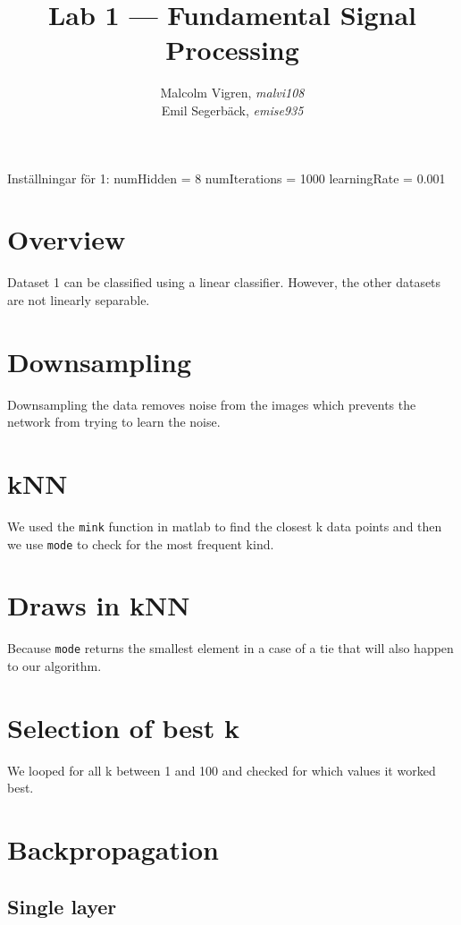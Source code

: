 \documentclass{article}
\begin{document}
\title{Lab 1 --- Fundamental Signal Processing}
\author{Malcolm Vigren, \textit{malvi108} \\
        Emil Segerbäck, \textit{emise935}}

\maketitle

Inställningar för 1:
numHidden = 8
numIterations = 1000
learningRate = 0.001

\section{Overview}
Dataset 1 can be classified using a linear classifier. However, the
other datasets are not linearly separable.

\section{Downsampling}
Downsampling the data removes noise from the images which prevents the
network from trying to learn the noise.

\section{kNN}
We used the \texttt{mink} function in matlab to find the closest k
data points and then we use \texttt{mode} to check for the most
frequent kind.

\section{Draws in kNN}
Because \texttt{mode} returns the smallest element in a case of a tie
that will also happen to our algorithm.

\section{Selection of best k}
We looped for all k between 1 and 100 and checked for which values it
worked best.

\section{Backpropagation}
\subsection{Single layer}
\end{document}
